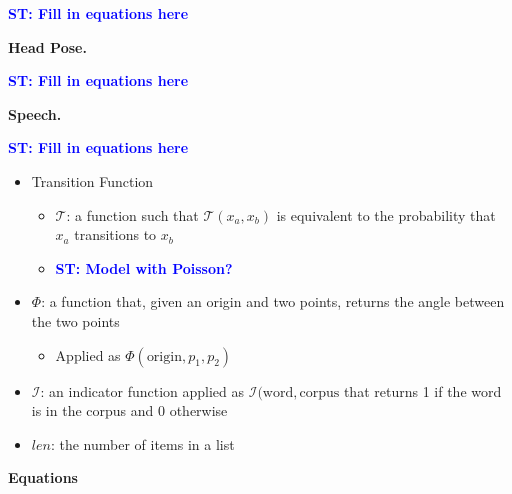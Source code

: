 \documentclass[letterpaper, 10 pt, conference]{ieeeconf}
\newcommand{\stnote}[1]{\textcolor{Blue}{\textbf{ST: #1}}}
\begin{document}
\stnote{Fill in equations here}

{\bf Head Pose.}

\stnote{Fill in equations here}

{\bf Speech.}

\stnote{Fill in equations here}



\begin{itemize}
\item{Transition Function}
	\begin{itemize}
	\item{$\mathcal{T}$: a function such that $\mathcal{T}(x_a, x_b)$ is equivalent to the probability that $x_a$ transitions to $x_b$}
	\item{\stnote{Model with Poisson?}}
	\end{itemize}

\item{$\Phi$: a function that, given an origin and two points, returns the angle between the two points}
	\begin{itemize}
	\item{Applied as $\Phi(\text{origin}, p_1, p_2)$}
	\end{itemize}
\item{$\mathcal{I}$: an indicator function applied as $\mathcal{I}(\text{word}, \text{corpus}$ that returns 1 if the word is in the corpus and 0 otherwise}
\item{$len$: the number of items in a list}
\end{itemize}
\textbf{Equations}
\end{document}
